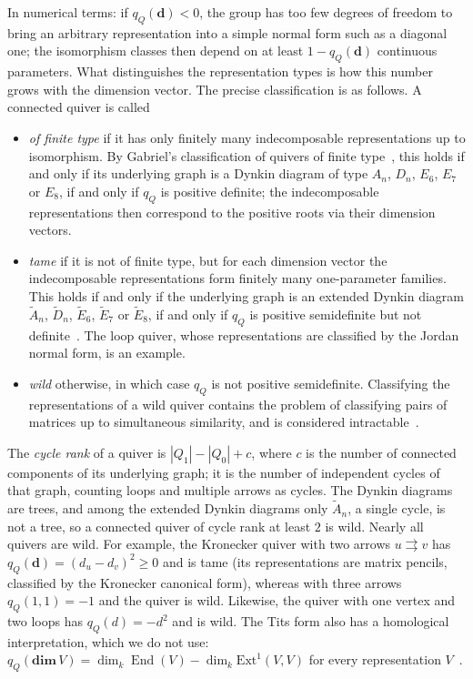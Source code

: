 \documentclass[12pt, a4paper]{report}
\theoremstyle{plain}
\theoremstyle{definition}
\theoremstyle{remark}
\theoremstyle{plain}
\DeclareMathOperator{\End}{End}
\begin{document}
In numerical terms: if $q_Q(\mathbf d)<0$, the group has too few degrees of freedom to bring an arbitrary representation into a simple normal form such as a diagonal one; the isomorphism classes then depend on at least $1-q_Q(\mathbf d)$ continuous parameters. What distinguishes the representation types is how this number grows with the dimension vector. The precise classification is as follows. A connected quiver is called
\begin{itemize}
    \item \emph{of finite type} if it has only finitely many indecomposable representations up to isomorphism. By Gabriel's classification of quivers of finite type~\cite{Gabriel1972}, this holds if and only if its underlying graph is a Dynkin diagram of type $A_n$, $D_n$, $E_6$, $E_7$ or $E_8$, if and only if $q_Q$ is positive definite; the indecomposable representations then correspond to the positive roots via their dimension vectors.
    \item \emph{tame} if it is not of finite type, but for each dimension vector the indecomposable representations form finitely many one-parameter families. This holds if and only if the underlying graph is an extended Dynkin diagram $\tilde A_n$, $\tilde D_n$, $\tilde E_6$, $\tilde E_7$ or $\tilde E_8$, if and only if $q_Q$ is positive semidefinite but not definite~\cite{DlabRingel1976}. The loop quiver, whose representations are classified by the Jordan normal form, is an example.
    \item \emph{wild} otherwise, in which case $q_Q$ is not positive semidefinite. Classifying the representations of a wild quiver contains the problem of classifying pairs of matrices up to simultaneous similarity, and is considered intractable~\cite{Kac1980,Drozd1980}.
\end{itemize}
The \emph{cycle rank} of a quiver is $|Q_1|-|Q_0|+c$, where $c$ is the number of connected components of its underlying graph; it is the number of independent cycles of that graph, counting loops and multiple arrows as cycles. The Dynkin diagrams are trees, and among the extended Dynkin diagrams only $\tilde A_n$, a single cycle, is not a tree, so a connected quiver of cycle rank at least $2$ is wild. Nearly all quivers are wild. For example, the Kronecker quiver with two arrows $u\rightrightarrows v$ has $q_Q(\mathbf d)=(d_u-d_v)^2\geq0$ and is tame (its representations are matrix pencils, classified by the Kronecker canonical form), whereas with three arrows $q_Q(1,1)=-1$ and the quiver is wild. Likewise, the quiver with one vertex and two loops has $q_Q(d)=-d^2$ and is wild. The Tits form also has a homological interpretation, which we do not use: $q_Q(\mathbf{dim}\,V)=\dim_k\End(V)-\dim_k\mathrm{Ext}^1(V,V)$ for every representation $V$~\cite{AssemSimsonSkowronski2006}.
\end{document}
